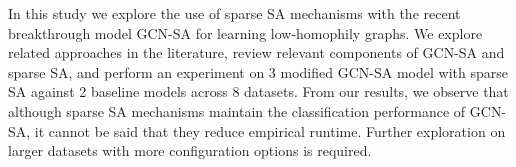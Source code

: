 In this study we 
explore the use of sparse SA mechanisms
with the recent breakthrough model
GCN-SA for learning low-homophily graphs.
We explore related approaches in the literature,
review relevant components of GCN-SA
and sparse SA,
and perform an experiment
on 3 modified GCN-SA model with sparse SA
against 2 baseline models
across 8 datasets.
From our results, 
we observe that
although sparse SA mechanisms maintain the classification
performance of GCN-SA,
it cannot be said that they reduce
empirical runtime.
Further exploration on larger datasets
with more configuration options is required.

